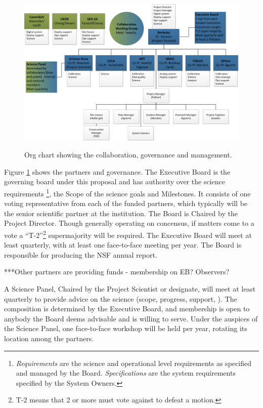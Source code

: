 \documentclass[preprint]{aastex}
\begin{document}
\begin{figure}[h]
\centering
\includegraphics[width=\textwidth]{plots/org.png}
\label{fig:org}
\caption{Org chart showing the collaboration, governance and management.}
\end{figure}

Figure \ref{fig:org} shows the partners and governance. The Executive Board is the
governing board under this proposal and has authority over the science requirements
\footnote{{\em Requirements} are the science and operational level requirements as
specified and managed by the Board.  {\em Specifications} are the system requirements
specified by the System Owners.}, the Scope of the science goals and Milestones. It consists 
of one voting representative from each of the funded partners, which typically will be the 
senior scientific partner at the institution. The Board is Chaired by the Project Director. Though 
generally operating on concensus, if matters come to a vote a ``T-2''\footnote{T-2 means that 2
or more must vote against to defeat a motion.} supermajority will be required. The
Executive Board will meet at least quarterly, with at least one face-to-face meeting
per year. The Board is responsible for producing the NSF annual report.

***Other partners are providing funds - membership on EB?  Observers?

A Science Panel, Chaired by the Project Scientist or designate, will meet at least
quarterly to provide advice on the science (scope, progress, support, ). The
composition is determined by the Executive Board, and membership is open to anybody
the Board deems advisable and is willing to serve. Under the auspices of the Science
Panel, one face-to-face workshop will be held per year, rotating its location among
the partners.
\end{document}

